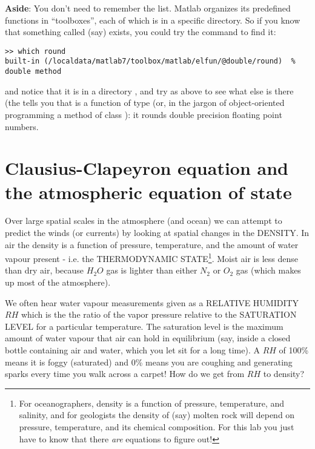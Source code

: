 \documentclass[letterpaper]{article}
\begin{document}
{\bf Aside}: You don't need to remember the  list.   Matlab organizes its predefined functions in
``toolboxes'', each of which is in a specific directory. So if you know that
something called (say)  exists, you could try the  command to find it:
\begin{lstlisting}
>> which round
built-in (/localdata/matlab7/toolbox/matlab/elfun/@double/round)  % double method
\end{lstlisting}
and notice that it is in a directory , and try  as
above to see what else is there (the 
tells you that  is a function of type  (or, in the jargon of object-oriented
programming a method of class ):
it rounds double precision floating point numbers.


\section{Clausius-Clapeyron equation and the atmospheric equation of state}

Over large spatial scales in the atmosphere (and ocean) we can attempt to predict the
winds (or currents) by looking at spatial changes in the DENSITY. In air the
density is a function of pressure, temperature, and the amount of water vapour 
present - i.e. the THERMODYNAMIC STATE\footnote{For oceanographers, density is a function of pressure, temperature,
and salinity, and for geologists the density of (say) molten rock will
depend on pressure, temperature, and its chemical composition. For this
lab you just have to know that there {\em are} equations to figure out!}. Moist
air is less dense than dry air, because $H_2O$ gas is lighter than either $N_2$ or $O_2$ gas (which
makes up most of the atmosphere).


We often hear water vapour measurements given as a RELATIVE HUMIDITY $RH$ which is the
the ratio of the vapor pressure relative to the SATURATION LEVEL for a particular temperature.
The saturation level is the maximum amount of water vapour that air can hold in equilibrium (say, inside 
a closed bottle containing air and water, which you let sit for a long time).
A $RH$ of 100\% means it is foggy (saturated)
and 0\% means you are coughing and generating sparks every time you walk across
a carpet! How do we get from $RH$ to density?
\end{document}
